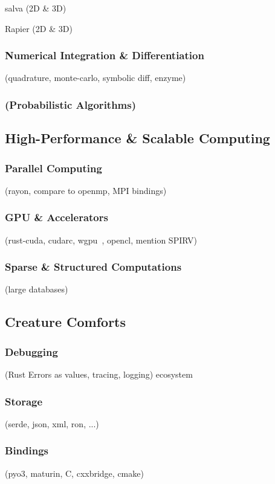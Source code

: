 \documentclass{article}
\begin{document}
salva (2D \& 3D)~\cite{Crozet2024}

Rapier (2D \& 3D)~\cite{Crozet2025}

\subsubsection{Numerical Integration \& Differentiation}
(quadrature, monte-carlo, symbolic diff, enzyme)

\subsubsection{(Probabilistic Algorithms)}

\subsection{High-Performance \& Scalable Computing}
\subsubsection{Parallel Computing}
(rayon, compare to openmp, MPI bindings)

\subsubsection{GPU \& Accelerators}
(rust-cuda, cudarc, wgpu~\cite{Fitzgerald2025}, opencl, mention SPIRV)

\subsubsection{Sparse \& Structured Computations}
(large databases)

\subsection{Creature Comforts}
\subsubsection{Debugging}
(Rust Errors as values, tracing, logging) ecosystem

\subsubsection{Storage}
(serde, json, xml, ron, ...)

\subsubsection{Bindings}
(pyo3, maturin, C, cxxbridge, cmake)
\end{document}

